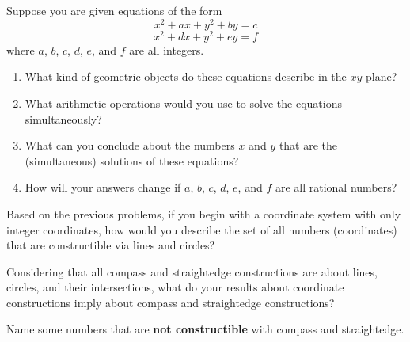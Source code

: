 \begin{prob}
Suppose you are given equations of the form 
$$x^2 + ax +y^2+by = c$$
$$x^2 + dx +y^2+ey = f$$
where $a$, $b$, $c$, $d$, $e$, and $f$ are all integers.  
\begin{enumerate}
\item What kind of geometric objects do these equations describe in the $xy$-plane?  
\item What arithmetic operations would you use to solve the equations simultaneously? 
\item What can you conclude about the numbers $x$ and $y$ that are the (simultaneous) solutions of these equations?  
\item How will your answers change if $a$, $b$, $c$, $d$, $e$, and $f$  are all rational numbers?  
\end{enumerate}
\end{prob}

\begin{prob}
Based on the previous problems, if you begin with a coordinate system with only integer coordinates, how would you describe the set of all numbers (coordinates) that are constructible via lines and circles?  
\end{prob}

\begin{prob}
Considering that all compass and straightedge constructions are about lines, circles, and their intersections, what do your results about coordinate constructions imply about compass and straightedge constructions?  
\end{prob}

\begin{prob}
Name some numbers that are \textbf{not constructible} with compass and straightedge.  
\end{prob}

